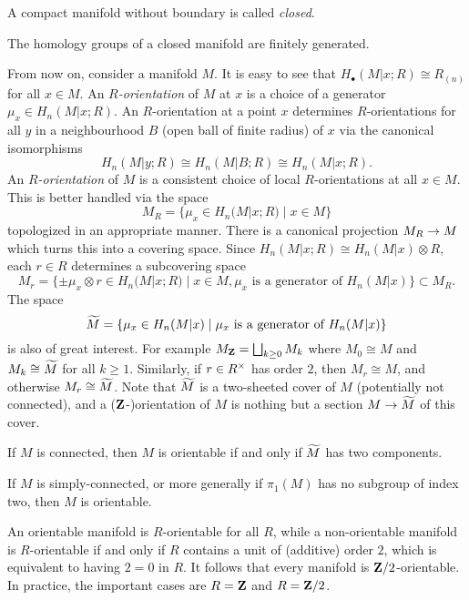 \begin{definition}
  A compact manifold without boundary is called \emph{closed}.
\end{definition}

\begin{theorem}
  The homology groups of a closed manifold are finitely generated.
\end{theorem}

From now on, consider a manifold $M$. It is easy to see that $H_\bullet(M|x;R) \cong R_{(n)}$ for all $x \in M$. An \emph{$R$-orientation} of $M$ at $x$ is a choice of a generator $\mu_x \in H_n(M|x;R)$. An $R$-orientation at a point $x$ determines $R$-orientations for all $y$ in a neighbourhood $B$ (open ball of finite radius) of $x$ via the canonical isomorphisms
\[
H_n(M|y;R) \cong H_n(M|B;R) \cong H_n(M|x;R).
\]
An \emph{$R$-orientation} of $M$ is a consistent choice of local $R$-orientations at all $x \in M$. This is better handled via the space
\[
M_R = \{ \mu_x \in H_n(M|x;R) \;|\; x \in M \}
\]
topologized in an appropriate manner. There is a canonical projection $M_R \rightarrow M$ which turns this into a covering space. Since $H_n(M|x;R) \cong H_n(M|x) \otimes R$, each $r \in R$ determines a subcovering space
\[
M_r = \{ \pm \mu_x \otimes r \in H_n(M|x;R) \;|\; x \in M, \mu_x \textrm{ is a generator of } H_n(M|x) \} \subset M_R.
\]
The space
\[
\widetilde{M} = \{ \mu_x \in H_n(M|x) \;|\; \mu_x \textnormal{ is a generator of } H_n(M|x) \}
\]
is also of great interest. For example $M_{\mathbf{Z}} = \bigsqcup_{k \geq 0} M_k$ where $M_0 \cong M$ and $M_k \cong \widetilde{M}$ for all $k \geq 1$. Similarly, if $r \in R^{\times}$ has order $2$, then $M_r \cong M$, and otherwise $M_r \cong \widetilde{M}$. Note that $\widetilde{M}$ is a two-sheeted cover of $M$ (potentially not connected), and a ($\mathbf{Z}$-)orientation of $M$ is nothing but a section $M \rightarrow \widetilde{M}$ of this cover.

\begin{proposition}
  If $M$ is connected, then $M$ is orientable if and only if $\widetilde{M}$ has two components.
\end{proposition}

\begin{corollary}
  If $M$ is simply-connected, or more generally if $\pi_1(M)$ has no subgroup of index two, then $M$ is orientable.
\end{corollary}

An orientable manifold is $R$-orientable for all $R$, while a non-orientable manifold is $R$-orientable if and only if $R$ contains a unit of (additive) order $2$, which is equivalent to having $2 = 0$ in $R$. It follows that every manifold is $\mathbf{Z}/2$-orientable. In practice, the important cases are $R = \mathbf{Z}$ and $R = \mathbf{Z}/2$.

